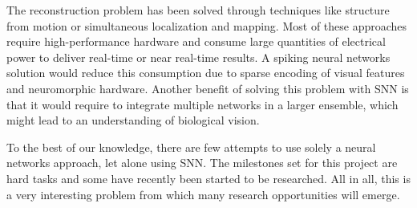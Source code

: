 The reconstruction problem has been solved through techniques like structure from motion or simultaneous localization and mapping. Most of these approaches require high-performance hardware and consume large quantities of electrical power to deliver real-time or near real-time results. A spiking neural networks solution would reduce this consumption due to sparse encoding of visual features and neuromorphic hardware. Another benefit of solving this problem with SNN is that it would require to integrate multiple networks in a larger ensemble, which might lead to an understanding of biological vision.

To the best of our knowledge, there are few attempts to use solely a neural networks approach, let alone using SNN. The milestones set for this project are hard tasks and some have recently been started to be researched. All in all, this is a very interesting problem from which many research opportunities will emerge.